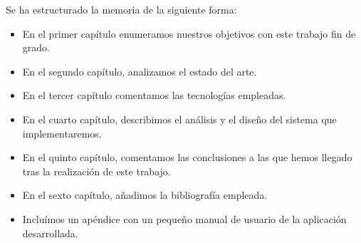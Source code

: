\documentclass[12pt,a4paper,oneside,spanish]{book}
\newcounter{ri}
\begin{document}
 Se ha estructurado la memoria de la siguiente forma:

\begin{itemize}
\item En el primer capítulo enumeramos nuestros objetivos con este trabajo fin de grado.
\item En el segundo capítulo, analizamos el estado del arte.
\item En el tercer capítulo comentamos las tecnologías empleadas.
\item En el cuarto capítulo, describimos el análisis y el diseño del sistema que implementaremos.
\item En el quinto capítulo, comentamos las conclusiones a las que hemos llegado tras la realización de este trabajo.
\item En el sexto capítulo, añadimos la bibliografía empleada.
\item Incluímos un apéndice con un pequeño manual de usuario de la aplicación desarrollada.
\end{itemize}







\end{document}
